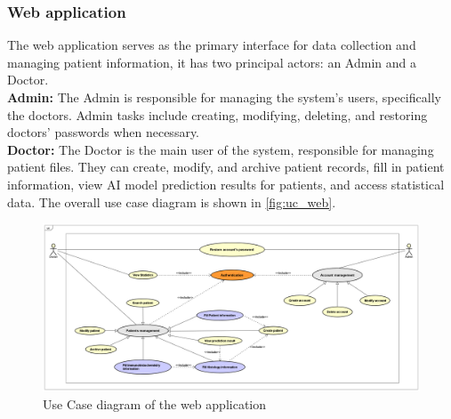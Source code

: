 \documentclass[
11pt, %
english, %
singlespacing, %
headsepline, %
]{project_structure}
\begin{document}
\subsubsection{Web application}
The web application serves as the primary interface for data collection and managing patient information, it has two principal actors: an Admin and a Doctor. \\

\noindent \textbf{Admin: } The Admin is responsible for managing the system's users, specifically the doctors. Admin tasks include creating, modifying, deleting, and restoring doctors' passwords when necessary. \\

\noindent \textbf{Doctor:} The Doctor is the main user of the system, responsible for managing patient files. They can create, modify, and archive patient records, fill in patient information, view AI model prediction results for patients, and access statistical data. The overall use case diagram is shown in \autoref{fig:uc_web}. 

\begin{figure}[H]
    \centering
    \includegraphics[width=1\textwidth]{figures/SI/uc_website.png}
    \caption{Use Case diagram of the web application}
    \label{fig:uc_web}
\end{figure}
\end{document}
